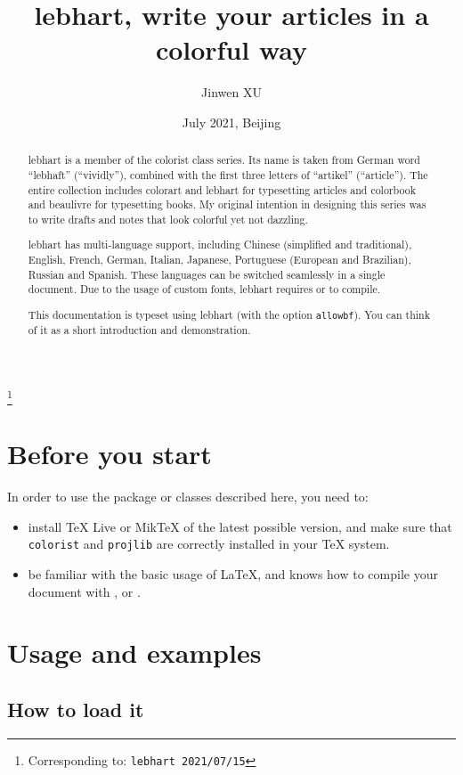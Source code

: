\documentclass[English,Chinese,French,allowbf,puretext]{lebhart}
\theoremstyle{basic}
\theoremstyle{emphasis}
\theoremstyle{simple}
\providecommand{\colorist}{\textsf{colorist}}
\providecommand{\colorart}{\textsf{colorart}}
\providecommand{\colorbook}{\textsf{colorbook}}
\providecommand{\lebhart}{\textsf{lebhart}}
\providecommand{\beaulivre}{\textsf{beaulivre}}
\let\LevelOneTitle\section
\let\LevelTwoTitle\subsection
\begin{document}
\title{\lebhart{}, write your articles in a colorful way}
\author{Jinwen XU}
\thanks{Corresponding to: \texttt{\lebhart{} 2021/07/15}}
\date{July 2021, Beijing}

\maketitle

\begin{abstract}
    \lebhart{} is a member of the \colorist{} class series. Its name is taken from German word ``lebhaft'' (``vividly''), combined with the first three letters of ``artikel'' (``article''). The entire collection includes \colorart{} and \lebhart{} for typesetting articles and \colorbook{} and \beaulivre{} for typesetting books. My original intention in designing this series was to write drafts and notes that look colorful yet not dazzling.

    \lebhart{} has multi-language support, including Chinese (simplified and traditional), English, French, German, Italian, Japanese, Portuguese (European and Brazilian), Russian and Spanish. These languages can be switched seamlessly in a single document. Due to the usage of custom fonts, \lebhart{} requires  or  to compile.

    This documentation is typeset using \lebhart{} (with the option \texttt{allowbf}). You can think of it as a short introduction and demonstration.
\end{abstract}


\setcounter{tocdepth}{2}
\tableofcontents


\medskip
\LevelOneTitle*{Before you start}
In order to use the package or classes described here, you need to:
\begin{itemize}
    \item install TeX Live or MikTeX of the latest possible version, and make sure that \texttt{colorist} and \texttt{projlib} are correctly installed in your \TeX{} system.
    \item be familiar with the basic usage of \LaTeX{}, and knows how to compile your document with ,  or .
\end{itemize}


\LevelOneTitle{Usage and examples}

\LevelTwoTitle{How to load it}
\end{document}
